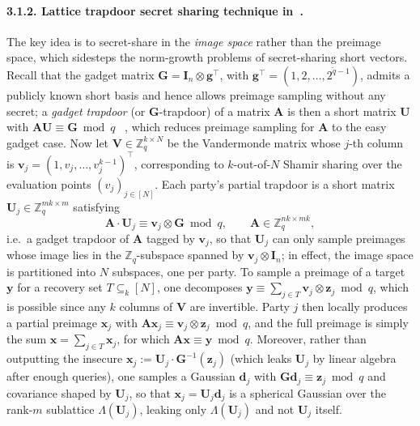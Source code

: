 \paragraph{3.1.2. Lattice trapdoor secret sharing technique in~\cite{AC:ALLW25}.}
The key idea is to secret-share in the \emph{image space} rather than the
preimage space, which sidesteps the norm-growth problems of secret-sharing short
vectors. Recall that the gadget matrix $\mathbf{G} = \mathbf{I}_n \otimes
\mathbf{g}^\top$, with $\mathbf{g}^\top = (1, 2, \dots, 2^{\tilde{q}-1})$, admits a
publicly known short basis and hence allows preimage sampling without any secret;
a \emph{gadget trapdoor} (or $\mathbf{G}$-trapdoor) of a matrix $\mathbf{A}$ is then
a short matrix $\mathbf{U}$ with $\mathbf{A}\mathbf{U} \equiv \mathbf{G} \bmod q$
~\cite{C:MicPei12}, which reduces preimage sampling for $\mathbf{A}$ to the easy
gadget case. Now let $\mathbf{V} \in \mathbb{Z}_q^{k\times N}$ be the Vandermonde
matrix whose $j$-th column is
$\mathbf{v}_j = (1, v_j, \dots, v_j^{k-1})^\top$, corresponding to $k$-out-of-$N$
Shamir sharing over the evaluation points $(v_j)_{j\in[N]}$. Each party's partial
trapdoor is a short matrix $\mathbf{U}_j \in \mathbb{Z}_q^{mk\times m}$ satisfying
\[
  \mathbf{A}\cdot\mathbf{U}_j \equiv \mathbf{v}_j \otimes \mathbf{G} \bmod q,
  \qquad \mathbf{A} \in \mathbb{Z}_q^{nk\times mk},
\]
i.e.\ a gadget trapdoor of $\mathbf{A}$ tagged by $\mathbf{v}_j$, so that
$\mathbf{U}_j$ can only sample preimages whose image lies in the
$\mathbb{Z}_q$-subspace spanned by $\mathbf{v}_j \otimes \mathbf{I}_n$; in effect,
the image space is partitioned into $N$ subspaces, one per party. To sample a
preimage of a target $\mathbf{y}$ for a recovery set $T \subseteq_k [N]$, one
decomposes $\mathbf{y} \equiv \sum_{j\in T} \mathbf{v}_j \otimes \mathbf{z}_j
\bmod q$, which is possible since any $k$ columns of $\mathbf{V}$ are invertible.
Party $j$ then locally produces a partial preimage $\mathbf{x}_j$ with
$\mathbf{A}\mathbf{x}_j \equiv \mathbf{v}_j \otimes \mathbf{z}_j \bmod q$, and the
full preimage is simply the sum $\mathbf{x} = \sum_{j\in T} \mathbf{x}_j$, for which
$\mathbf{A}\mathbf{x} \equiv \mathbf{y} \bmod q$. Moreover, rather than outputting
the insecure $\mathbf{x}_j := \mathbf{U}_j \cdot \mathbf{G}^{-1}(\mathbf{z}_j)$
(which leaks $\mathbf{U}_j$ by linear algebra after enough queries), one samples a
Gaussian $\mathbf{d}_j$ with $\mathbf{G}\mathbf{d}_j \equiv \mathbf{z}_j \bmod q$
and covariance shaped by $\mathbf{U}_j$, so that $\mathbf{x}_j = \mathbf{U}_j
\mathbf{d}_j$ is a spherical Gaussian over the rank-$m$ sublattice
$\Lambda(\mathbf{U}_j)$, leaking only $\Lambda(\mathbf{U}_j)$ and not $\mathbf{U}_j$
itself.

